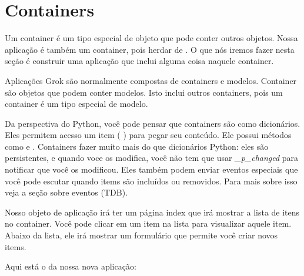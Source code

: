 \documentclass[a4paper,12pt,portuguese]{manual}
\begin{document}
\section{Containers}

Um container é um tipo especial de objeto que pode conter outros
objetos. Nossa aplicação  é também um container, pois
herdar de . O que nós iremos fazer nesta seção é
construir uma aplicação que inclui alguma coisa naquele container.

Aplicações Grok são normalmente compostas de containers e modelos.
Container são objetos que podem conter modelos. Isto inclui outros
containers, pois um container é um tipo especial de modelo.

Da perspectiva do Python, você pode pensar que containers são como
dicionários. Eles permitem acesso um item (  )
para pegar seu conteúdo. Ele possui métodos como  e
. Containers fazer muito mais do que dicionários Python:
eles são persistentes, e quando voce os modifica, você não tem que
usar \emph{\_p\_changed} para notificar que você os modificou. Eles também
podem enviar eventos especiais que você pode escutar quando items são
incluídos ou removidos. Para mais sobre isso veja a seção sobre
eventos (TDB).

Nosso objeto de aplicação irá ter um página index que irá mostrar a
lista de itens no container. Você pode clicar em um item na lista para
visualizar aquele item. Abaixo da lista, ele irá mostrar um formulário
que permite você criar novos items.

Aqui está o  da nossa nova aplicação:
\end{document}
